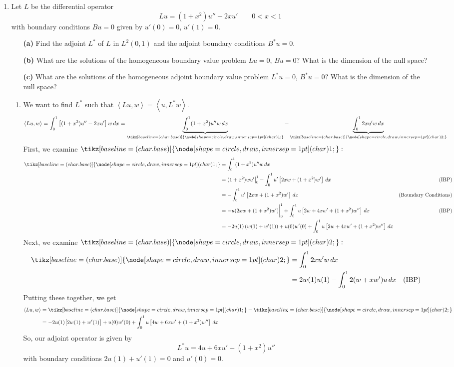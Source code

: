 \documentclass[10pt,letterpaper]{report}
\newcommand{\ip}[2]{\left\langle{#1},{#2}\right\rangle}
\newcommand{\circled}[1]{\tikz[baseline=(char.base)]{\node[shape=circle,draw,inner sep=1pt] (char) {\scriptsize #1};}}
\newcommand{\undernum}[2]{\underbrace{#1}_{\circled{#2}}}
\begin{document}
\begin{enumerate}
\item \begin{qbox}
Let $L$ be the differential operator
\[
Lu = (1 + x^2)u'' - 2xu' \qquad 0 < x < 1
\]
with boundary conditions $Bu = 0$ given by $u'(0) = 0$, $u'(1) = 0$.
\begin{itemize}
    \item[\textbf{(a)}] Find the adjoint $L^*$ of $L$ in $L^2(0, 1)$ and the adjoint boundary conditions $B^*u = 0$.
    
    \item[\textbf{(b)}] What are the solutions of the homogeneous boundary value problem $Lu = 0$, $Bu = 0$? What is the dimension of the null space?
    
    \item[\textbf{(c)}] What are the solutions of the homogeneous adjoint boundary value problem $L^*u = 0$, $B^*u = 0$? What is the dimension of the null space?
\end{itemize}
\end{qbox}
\begin{enumerate}
    \item We want to find $L^*$ such that $\ip{Lu}{w} = \ip{u}{L^* w}$.
    \begin{align*}
        \ip{Lu}{w} &= \int_0^1\left[(1+x^2)u'' - 2xu'\right]w\,dx
        =
        \undernum{\int_0^1(1+x^2)u''w\,dx}{1} - \undernum{\int_0^12xu'w\,dx}{2}
    \end{align*}
    First, we examine $\circled 1 :$
    \begin{align*}
        \circled 1 &= \int_0^1(1+x^2)u''w\,dx \\
        &= (1 + x^2)wu'\big\vert_0^1 - \int_0^1 u'\left[2xw + (1+x^2)w'\right]\,dx &\textrm{(IBP)}
        \\
        &= - \int_0^1 u'\left[2xw + (1+x^2)w'\right]\,dx &\textrm{(Boundary Conditions)}
        \\
        &= -u(2xw + (1+x^2)w')\bigg\vert_0^1 + \int_0^1 u\left[2w + 4xw' + (1+x^2)w''\right]\,dx &\textrm{(IBP)}
        \\
        &= -2u(1)\left(w(1)+w'(1)\right) + u(0)w'(0) + \int_0^1 u\left[2w + 4xw' + (1+x^2)w''\right]\,dx
    \end{align*}
    Next, we examine $\circled 2:$
    \begin{align*}
        \circled 2 &= 
        \int_0^12xu'w\,dx \\
        &= 
        2w(1)u(1) -  \int_0^1 2(w + xw')u\,dx &\textrm{(IBP)}
    \end{align*}
    Putting these together, we get
    \begin{align*}
        \ip{Lu}{w} &= \circled 1 - \circled 2
        \\
        &= -2u(1)\big[2w(1) + w'(1)\big] + u(0)w'(0) + \int_0^1 u\left[4w + 6xw' + (1+x^2)w''\right]\,dx
    \end{align*}
    So, our adjoint operator is given by
    \[
    L^* u = 4u + 6xu' + (1+x^2)u''
    \]
    with boundary conditions $2u(1) + u'(1) = 0$ and $u'(0) = 0$.
    

\end{enumerate}
\end{enumerate}
\end{document}
